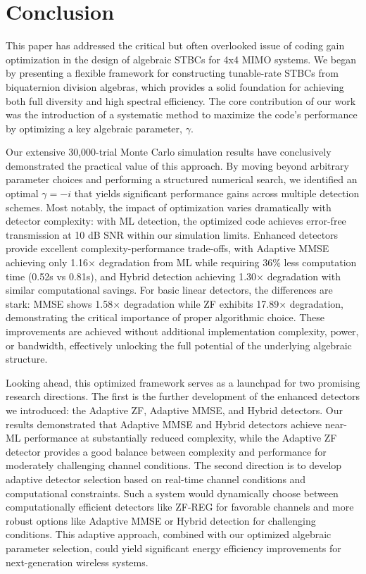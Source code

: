 \section{Conclusion}
This paper has addressed the critical but often overlooked issue of coding gain optimization in the design of algebraic STBCs for 4x4 MIMO systems. We began by presenting a flexible framework for constructing tunable-rate STBCs from biquaternion division algebras, which provides a solid foundation for achieving both full diversity and high spectral efficiency. The core contribution of our work was the introduction of a systematic method to maximize the code's performance by optimizing a key algebraic parameter, \(\gamma\).

Our extensive 30,000-trial Monte Carlo simulation results have conclusively demonstrated the practical value of this approach. By moving beyond arbitrary parameter choices and performing a structured numerical search, we identified an optimal \(\gamma = -i\) that yields significant performance gains across multiple detection schemes. Most notably, the impact of optimization varies dramatically with detector complexity: with ML detection, the optimized code achieves error-free transmission at 10 dB SNR within our simulation limits. Enhanced detectors provide excellent complexity-performance trade-offs, with Adaptive MMSE achieving only 1.16$\times$ degradation from ML while requiring 36\% less computation time (0.52s vs 0.81s), and Hybrid detection achieving 1.30$\times$ degradation with similar computational savings. For basic linear detectors, the differences are stark: MMSE shows 1.58$\times$ degradation while ZF exhibits 17.89$\times$ degradation, demonstrating the critical importance of proper algorithmic choice. These improvements are achieved without additional implementation complexity, power, or bandwidth, effectively unlocking the full potential of the underlying algebraic structure.

Looking ahead, this optimized framework serves as a launchpad for two promising research directions. The first is the further development of the enhanced detectors we introduced: the Adaptive ZF, Adaptive MMSE, and Hybrid detectors. Our results demonstrated that Adaptive MMSE and Hybrid detectors achieve near-ML performance at substantially reduced complexity, while the Adaptive ZF detector provides a good balance between complexity and performance for moderately challenging channel conditions. The second direction is to develop adaptive detector selection based on real-time channel conditions and computational constraints. Such a system would dynamically choose between computationally efficient detectors like ZF-REG for favorable channels and more robust options like Adaptive MMSE or Hybrid detection for challenging conditions. This adaptive approach, combined with our optimized algebraic parameter selection, could yield significant energy efficiency improvements for next-generation wireless systems.
